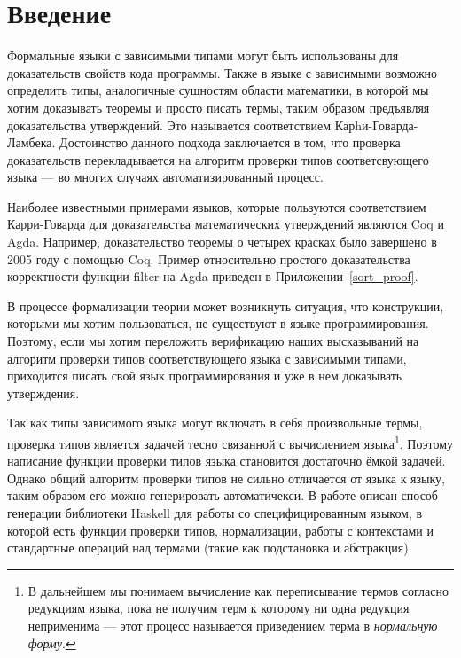 \section*{Введение}
Формальные языки с зависимыми типами могут быть использованы для доказательств свойств кода программы. Также в языке с зависимыми возможно определить типы, аналогичные сущностям области математики, в которой мы хотим доказывать теоремы и просто писать термы, таким образом предъявляя доказательства утверждений. Это называется соответствием Карhи-Говарда-Ламбека\cite{curry_how}. Достоинство данного подхода заключается в том, что проверка доказательств перекладывается на алгоритм проверки типов соответсвующего языка --- во многих случаях автоматизированный процесс.

Наиболее известными примерами языков, которые пользуются соответствием Карри-Говарда для доказательства математических утверждений являются Coq\cite{coq} и Agda\cite{agda}. Например, доказательство теоремы о четырех красках было завершено в 2005 году с помощью Coq\cite{weisstein2002four}.
Пример относительно простого доказательства корректности функции filter на Agda приведен в Приложении~\ref{sort_proof}.

\hfill

В процессе формализации теории может возникнуть ситуация, что конструкции, которыми мы хотим пользоваться, не существуют в языке программирования. Поэтому, если мы хотим переложить верификацию наших высказываний на алгоритм проверки типов соответствующего языка с зависимыми типами, приходится писать свой язык программирования и уже в нем доказывать утверждения.

Так как типы зависимого языка могут включать в себя произвольные термы, проверка типов является задачей тесно связанной с вычислением языка\footnote{В дальнейшем мы понимаем вычисление как переписывание термов согласно редукциям языка, пока не получим терм к которому ни одна редукция неприменима --- этот процесс называется приведением терма в \textit{нормальную форму}.}. Поэтому написание функции проверки типов языка становится достаточно ёмкой задачей. Однако общий алгоритм проверки типов не сильно отличается от языка к языку, таким образом его можно генерировать автоматичекси. В работе описан способ генерации библиотеки Haskell\cite{haskell} для работы со специфицированным языком, в которой есть функции проверки типов, нормализации, работы с контекстами и стандартные операций над термами (такие как подстановка и абстракция).

\hfill

